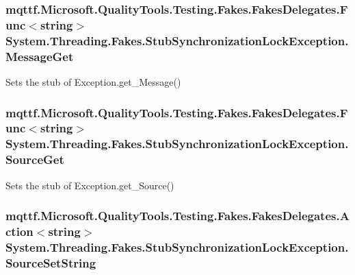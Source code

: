 \hypertarget{class_system_1_1_threading_1_1_fakes_1_1_stub_synchronization_lock_exception_a4906e857935f6b5e82340fc9aa37e3fe}{
\subsubsection[{Message\-Get}]{\setlength{\rightskip}{0pt plus 5cm}mqttf.\-Microsoft.\-Quality\-Tools.\-Testing.\-Fakes.\-Fakes\-Delegates.\-Func$<$string$>$ System.\-Threading.\-Fakes.\-Stub\-Synchronization\-Lock\-Exception.\-Message\-Get}}\label{class_system_1_1_threading_1_1_fakes_1_1_stub_synchronization_lock_exception_a4906e857935f6b5e82340fc9aa37e3fe}


Sets the stub of Exception.\-get\-\_\-\-Message()

\hypertarget{class_system_1_1_threading_1_1_fakes_1_1_stub_synchronization_lock_exception_afd28078a0a95c9376dbf9bc68209e9f1}{
\subsubsection[{Source\-Get}]{\setlength{\rightskip}{0pt plus 5cm}mqttf.\-Microsoft.\-Quality\-Tools.\-Testing.\-Fakes.\-Fakes\-Delegates.\-Func$<$string$>$ System.\-Threading.\-Fakes.\-Stub\-Synchronization\-Lock\-Exception.\-Source\-Get}}\label{class_system_1_1_threading_1_1_fakes_1_1_stub_synchronization_lock_exception_afd28078a0a95c9376dbf9bc68209e9f1}


Sets the stub of Exception.\-get\-\_\-\-Source()

\hypertarget{class_system_1_1_threading_1_1_fakes_1_1_stub_synchronization_lock_exception_a15fc532dff760f3aceda06d23c821dfe}{
\subsubsection[{Source\-Set\-String}]{\setlength{\rightskip}{0pt plus 5cm}mqttf.\-Microsoft.\-Quality\-Tools.\-Testing.\-Fakes.\-Fakes\-Delegates.\-Action$<$string$>$ System.\-Threading.\-Fakes.\-Stub\-Synchronization\-Lock\-Exception.\-Source\-Set\-String}}\label{class_system_1_1_threading_1_1_fakes_1_1_stub_synchronization_lock_exception_a15fc532dff760f3aceda06d23c821dfe}


